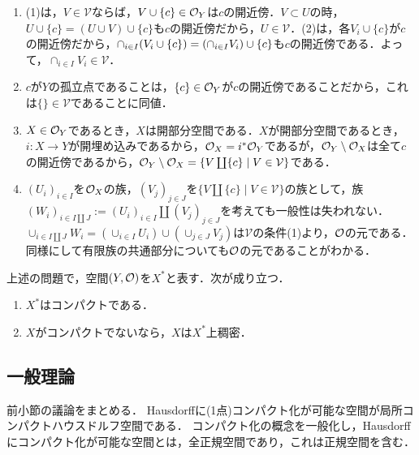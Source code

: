 \documentclass[uplatex,dvipdfmx]{jsreport}
\begin{document}
\begin{Proof}\mbox{}
    \begin{enumerate}
        \item (1)は，$V\in\mathcal{V}$ならば，$V\cup\{c\}\in\mathcal{O}_Y$は$c$の開近傍．$V\subset U$の時，$U\cup\{c\}=(U\cup V)\cup\{c\}$も$c$の開近傍だから，$U\in\mathcal{V}$．(2)は，各$V_i\cup\{c\}$が$c$の開近傍だから，$\cap_{i\in I}(V_i\cup\{c\})=\left(\cap_{i\in I}V_i\right)\cup\{c\}$も$c$の開近傍である．よって，$\cap_{i\in I}V_i\in\mathcal{V}$．
        \item $c$が$Y$の孤立点であることは，$\{c\}\in\mathcal{O}_Y$が$c$の開近傍であることだから，これは$\{\}\in\mathcal{V}$であることに同値．
        \item $X\in\mathcal{O}_Y$であるとき，$X$は開部分空間である．$X$が開部分空間であるとき，$i:X\to Y$が開埋め込みであるから，$\mathcal{O}_X=i^*\mathcal{O}_Y$であるが，$\mathcal{O}_Y\setminus\mathcal{O}_X$は全て$c$の開近傍であるから，$\mathcal{O}_Y\setminus\mathcal{O}_X=\{V\coprod\{c\}\mid V\in\mathcal{V}\}$である．
        \item $(U_i)_{i\in I}$を$\mathcal{O}_X$の族，$(V_j)_{j\in J}$を$\{V\coprod\{c\}\mid V\in\mathcal{V}\}$の族として，族$(W_i)_{i\in I\coprod J}:=(U_i)_{i\in I}\coprod(V_j)_{j\in J}$を考えても一般性は失われない．$\cup_{i\in I\coprod J}W_i=(\cup_{i\in I}U_i)\cup(\cup_{j\in J}V_j)$は$\mathcal{V}$の条件(1)より，$\mathcal{O}$の元である．同様にして有限族の共通部分についても$\mathcal{O}$の元であることがわかる．
    \end{enumerate}
\end{Proof}

\begin{theorem}
    上述の問題で，空間$(Y,\mathcal{O})$を$X^*$と表す．次が成り立つ．
    \begin{enumerate}
        \item $X^*$はコンパクトである．
        \item $X$がコンパクトでないなら，$X$は$X^*$上稠密．
    \end{enumerate}
\end{theorem}

\subsection{一般理論}

\begin{tcolorbox}[colframe=ForestGreen, colback=ForestGreen!10!white,breakable,colbacktitle=ForestGreen!40!white,coltitle=black,fonttitle=\bfseries\sffamily,
title=]
前小節の議論をまとめる．
Hausdorffに(1点)コンパクト化が可能な空間が局所コンパクトハウスドルフ空間である．
コンパクト化の概念を一般化し，Hausdorffにコンパクト化が可能な空間とは，全正規空間であり，これは正規空間を含む．
\end{tcolorbox}
\end{document}
